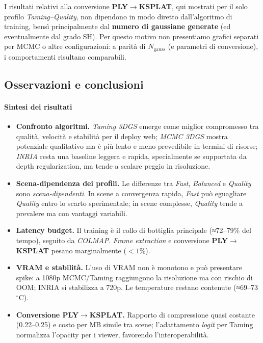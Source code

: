 I risultati relativi alla conversione \textbf{PLY$\rightarrow$KSPLAT}, qui mostrati per il solo profilo \emph{Taming–Quality}, non dipendono in modo diretto dall’algoritmo di training, bensì principalmente dal \textbf{numero di gaussiane generate} (ed eventualmente dal grado SH). Per questo motivo non presentiamo grafici separati per MCMC o altre configurazioni: a parità di $N_{\text{gauss}}$ (e parametri di conversione), i comportamenti risultano comparabili.

\subsection{Osservazioni e conclusioni}

\paragraph{Sintesi dei risultati}
\begin{itemize}
	\item \textbf{Confronto algoritmi.} \textit{Taming 3DGS} emerge come miglior compromesso tra qualità, velocità e stabilità per il deploy web; \textit{MCMC 3DGS} mostra potenziale qualitativo ma è più lento e meno prevedibile in termini di risorse; \textit{INRIA} resta una baseline leggera e rapida, specialmente se supportata da depth regularization, ma tende a scalare peggio in risoluzione.
	\item \textbf{Scena-dipendenza dei profili.} Le differenze tra \textit{Fast}, \textit{Balanced} e \textit{Quality} sono \emph{scena-dipendenti}. In scene a convergenza rapida, \textit{Fast} può eguagliare \textit{Quality} entro lo scarto sperimentale; in scene complesse, \textit{Quality} tende a prevalere ma con vantaggi variabili.
	\item \textbf{Latency budget.} Il training è il collo di bottiglia principale (≈72–79\% del tempo), seguito da \textit{COLMAP}. \textit{Frame extraction} e conversione \textbf{PLY$\rightarrow$KSPLAT} pesano marginalmente ($<1\%$).
	\item \textbf{VRAM e stabilità.} L’uso di VRAM non è monotono e può presentare spike: a 1080p MCMC/Taming raggiungono la risoluzione ma con rischio di OOM; INRIA si stabilizza a 720p. Le temperature restano contenute (≈69–73\,${}^\circ$C).
	\item \textbf{Conversione PLY$\rightarrow$KSPLAT.} Rapporto di compressione quasi costante (0.22–0.25) e costo per MB simile tra scene; l’adattamento \emph{logit} per Taming normalizza l’opacity per i viewer, favorendo l’interoperabilità.
\end{itemize}

